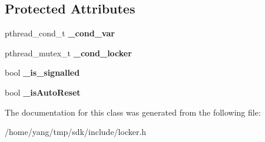 \subsection*{Protected Attributes}
\begin{DoxyCompactItemize}
\item 
pthread\+\_\+cond\+\_\+t {\bfseries \+\_\+cond\+\_\+var}\hypertarget{class_event_acf1cb5e02dbbb2d32319f1f60f1cb9fa}{}\label{class_event_acf1cb5e02dbbb2d32319f1f60f1cb9fa}

\item 
pthread\+\_\+mutex\+\_\+t {\bfseries \+\_\+cond\+\_\+locker}\hypertarget{class_event_a151be53028faee4d60620cca190df90b}{}\label{class_event_a151be53028faee4d60620cca190df90b}

\item 
bool {\bfseries \+\_\+is\+\_\+signalled}\hypertarget{class_event_afdbb004c4e19a444aebf79b4745c2c76}{}\label{class_event_afdbb004c4e19a444aebf79b4745c2c76}

\item 
bool {\bfseries \+\_\+is\+Auto\+Reset}\hypertarget{class_event_a7f609b99f6132b957a68324b3f80441b}{}\label{class_event_a7f609b99f6132b957a68324b3f80441b}

\end{DoxyCompactItemize}


The documentation for this class was generated from the following file\+:\begin{DoxyCompactItemize}
\item 
/home/yang/tmp/sdk/include/locker.\+h\end{DoxyCompactItemize}
